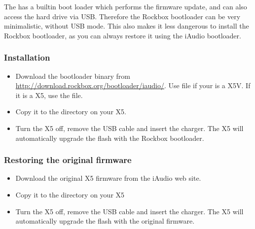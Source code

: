 
The \playerman{} \playername{} has a builtin boot loader which performs the 
firmware update, and can also access the hard drive via USB. Therefore the 
Rockbox bootloader can be very minimalistic, without USB mode.
This also makes it less dangerous to install the Rockbox bootloader, as you can
always restore it using the iAudio bootloader.


\subsubsection{Installation}
\begin{itemize}
\item Download the bootloader binary from 
\url{http://download.rockbox.org/bootloader/iaudio/}. Use 
file if your \dap{} is a X5V. If it is a X5, use the  file.
\item Copy it to the  directory on your X5.
\item Turn the X5 off, remove the USB cable and insert the charger. The X5 will
automatically upgrade the flash with the Rockbox bootloader.
\end{itemize}

\subsubsection{Restoring the original firmware}
\begin{itemize}
\item Download the original X5 firmware from the iAudio web site.
\item Copy it to the  directory on your X5
\item Turn the X5 off, remove the USB cable and insert the charger. The X5 will
automatically upgrade the flash with the original firmware.
\end{itemize}
